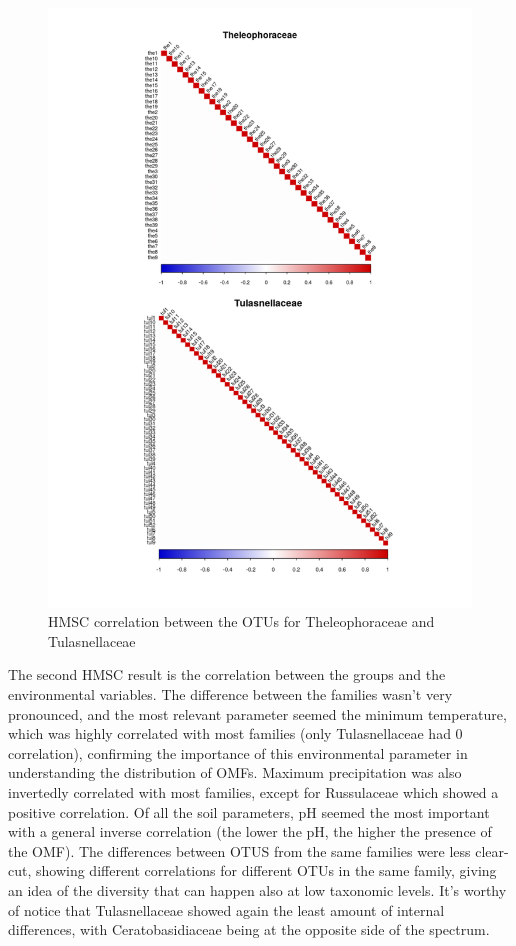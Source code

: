 \begin{figure}[htbp]
\centering
\includegraphics[keepaspectratio,width=\textwidth,height=0.75\textheight]{images/hmscfam02.png}
\caption{HMSC correlation between the OTUs for Theleophoraceae and Tulasnellaceae}
\end{figure}

The second HMSC result is the correlation between the groups and the environmental variables.
The difference between the families wasn't very pronounced, and the most relevant parameter seemed the minimum temperature, which was highly correlated with most families (only Tulasnellaceae had 0 correlation), confirming the importance of this environmental parameter in understanding the distribution of OMFs. Maximum precipitation was also invertedly correlated with most families, except for Russulaceae which showed a positive correlation. Of all the soil parameters, pH seemed the most important with a general inverse correlation (the lower the pH, the higher the presence of the OMF).
The differences between OTUS from the same families were less clear-cut, showing different correlations for different OTUs in the same family, giving an idea of the diversity that can happen also at low taxonomic levels.
It's worthy of notice that Tulasnellaceae showed again the least amount of internal differences, with Ceratobasidiaceae being at the opposite side of the spectrum.

